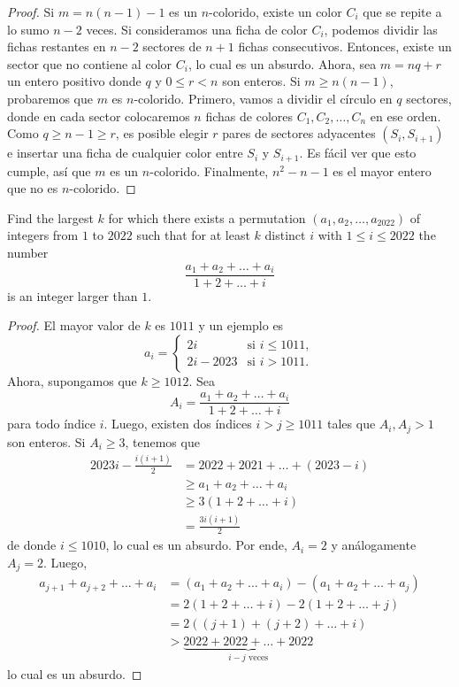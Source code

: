 \begin{proof}
	Si $m=n(n-1)-1$ es un $n$-colorido, existe un color $C_i$ que se repite a lo sumo $n-2$ veces. Si consideramos una ficha de color $C_i$, podemos dividir las fichas restantes en $n-2$ sectores de $n+1$ fichas consecutivos. Entonces, existe un sector que no contiene al color $C_i$, lo cual es un absurdo. Ahora, sea $m=nq+r$ un entero positivo donde $q$ y $0\le r<n$ son enteros. Si $m\ge n(n-1)$, probaremos que $m$ es $n$-colorido. Primero, vamos a dividir el círculo en $q$ sectores, donde en cada sector colocaremos $n$ fichas de colores $C_1,C_2,\dots,C_n$ en ese orden. Como $q\ge n-1\ge r$, es posible elegir $r$ pares de sectores adyacentes $(S_i,S_{i+1})$ e insertar una ficha de cualquier color entre $S_i$ y $S_{i+1}$. Es fácil ver que esto cumple, así que $m$ es un $n$-colorido. Finalmente, $n^2-n-1$ es el mayor entero que no es $n$-colorido.
\end{proof}

\begin{probEG}
	Find the largest $k$ for which there exists a permutation $(a_1,a_2,\dots,a_{2022})$ of integers from $1$ to $2022$ such that for at least $k$ distinct $i$ with $1\le i\le 2022$ the number
	\[\frac{a_1+a_2+\dots+a_i}{1+2+\dots+i}\]
	is an integer larger than $1$.
\end{probEG}

\begin{proof}
	El mayor valor de $k$ es $1011$ y un ejemplo es
	\[a_i=\begin{cases}
		2i&\text{si }i\le 1011, \\
		2i-2023&\text{si }i>1011.
	\end{cases}\]
	Ahora, supongamos que $k\ge 1012$. Sea
	\[A_i=\frac{a_1+a_2+\dots+a_i}{1+2+\dots+i}\]
	para todo índice $i$. Luego, existen dos índices $i>j\ge 1011$ tales que $A_i,A_j>1$ son enteros. Si $A_i\ge 3$, tenemos que
	\begin{align*}
		2023i-\frac{i(i+1)}{2}
		&=2022+2021+\dots+(2023-i) \\
		&\ge a_1+a_2+\dots+a_i \\
		&\ge 3(1+2+\dots+i) \\
		&=\frac{3i(i+1)}{2}
	\end{align*}
	de donde $i\le 1010$, lo cual es un absurdo. Por ende, $A_i=2$ y análogamente $A_j=2$. Luego,
	\begin{align*}
		a_{j+1}+a_{j+2}+\dots+a_i
		&=(a_1+a_2+\dots+a_i)-(a_1+a_2+\dots+a_j) \\
		&=2(1+2+\dots+i)-2(1+2+\dots+j) \\
		&=2((j+1)+(j+2)+\dots+i) \\
		&>\underbrace{2022+2022+\dots+2022}_{i-j\text{ veces}}
	\end{align*}
	lo cual es un absurdo.
\end{proof}

